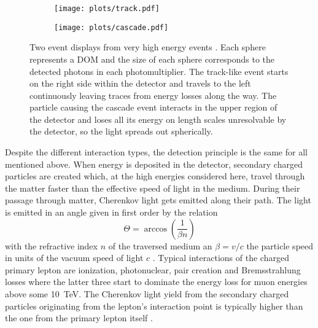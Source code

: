 \begin{figure}[htbp]
  \centering
  \begin{subfigure}[c]{0.49\textwidth}
    \texttt{[image: plots/track.pdf]}
  \end{subfigure}
  \hfill
  \begin{subfigure}[c]{0.49\textwidth}
    \texttt{[image: plots/cascade.pdf]}
  \end{subfigure}
  \caption{
    Two event displays from very high energy events .
    Each sphere represents a DOM and the size of each sphere corresponds to the detected photons in each photomultiplier.
    The track-like event starts on the right side within the detector and travels to the left continuously leaving traces from energy losses along the way.
    The particle causing the cascade event interacts in the upper region of the detector and loses all its energy on length scales unresolvable by the detector, so the light spreads out spherically.
  }
  \label{fig:icecube_events_topologies}
\end{figure}

Despite the different interaction types, the detection principle is the same for all mentioned above.
When energy is deposited in the detector, secondary charged particles are created which, at the high energies considered here, travel through the matter faster than the effective speed of light in the medium.
During their passage through matter, Cherenkov light gets emitted along their path.
The light is emitted in an angle given in first order by the relation
\begin{equation}
  \Theta = \arccos\left(\frac{1}{\beta n}\right)
\end{equation}
with the refractive index $n$ of the traversed medium an $\beta = v/c$ the particle speed in units of the vacuum speed of light $c$ .
Typical interactions of the charged primary lepton are ionization, photonuclear, pair creation and Bremsstrahlung losses where the latter three start to dominate the energy loss for muon energies above some \SI{10}{\tera\eV}.
The Cherenkov light yield from the secondary charged particles originating from the lepton's interaction point is typically higher than the one from the primary lepton itself .

